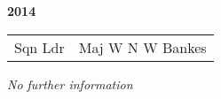 \begin{center}
  \Huge
  \textbf{2014}
\end{center}

\begin{center}
  \small
  \begin{tabular}{rl}
    Sqn Ldr & Maj W N W Bankes \\
  \end{tabular}
\end{center}

\begin{center}
  \textit{No further information}
\end{center}

\vspace{50mm}

\pagebreak
